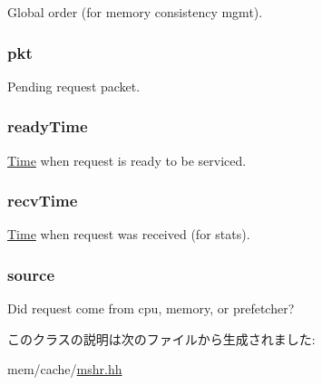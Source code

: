 Global order (for memory consistency mgmt). \hypertarget{classMSHR_1_1Target_a3a891bc2a0fcbe6be5297077d94e2df7}{
\subsubsection[{pkt}]{ {\bf pkt}}}
\label{classMSHR_1_1Target_a3a891bc2a0fcbe6be5297077d94e2df7}


Pending request packet. \hypertarget{classMSHR_1_1Target_a7cb362ebfb8750bd53baf5e8f96e00d0}{
\subsubsection[{readyTime}]{ {\bf readyTime}}}
\label{classMSHR_1_1Target_a7cb362ebfb8750bd53baf5e8f96e00d0}


\hyperlink{classTime}{Time} when request is ready to be serviced. \hypertarget{classMSHR_1_1Target_afb564669ac735617979c31edf7f97e2a}{
\subsubsection[{recvTime}]{ {\bf recvTime}}}
\label{classMSHR_1_1Target_afb564669ac735617979c31edf7f97e2a}


\hyperlink{classTime}{Time} when request was received (for stats). \hypertarget{classMSHR_1_1Target_a6bfef4fd519b1708e99617d59d9c62cd}{
\subsubsection[{source}]{ {\bf source}}}
\label{classMSHR_1_1Target_a6bfef4fd519b1708e99617d59d9c62cd}


Did request come from cpu, memory, or prefetcher? 

このクラスの説明は次のファイルから生成されました:\begin{DoxyCompactItemize}
\item 
mem/cache/\hyperlink{mshr_8hh}{mshr.hh}\end{DoxyCompactItemize}
